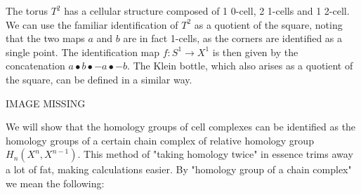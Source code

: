 \begin{example}
The torus $T^2$ has a cellular structure composed of 1 0-cell, 2 1-cells and 1 2-cell. We can use the familiar identification of $T^2$ as a quotient of the square, noting that the two maps $a$ and $b$ are in fact 1-cells, as the corners are identified as a single point. The identification map $f:S^1\rightarrow X^1$ is then given by the concatenation $a\bullet b\bullet -a \bullet -b$. The Klein bottle, which also arises as a quotient of the square, can be defined in a similar way.

IMAGE MISSING
\end{example}

We will show that the homology groups of cell complexes can be identified as the homology groups of a certain chain complex of relative homology group $H_n(X^n,X^{n-1})$. This method of "taking homology twice" in essence trims away a lot of fat, making calculations easier. By "homology group of a chain complex" we mean the following:

